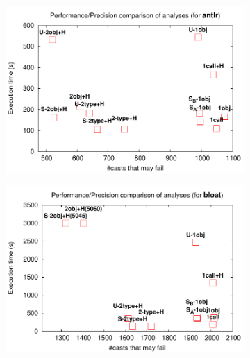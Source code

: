 
\begin{figure}[tb!p]
\begin{center}
\begin{subfigure}[b]{0.45\textwidth}
\includegraphics[width=\textwidth]{assets/hybrid/antlr.pdf}
\end{subfigure}\hspace{1cm}%
\begin{subfigure}[b]{0.45\textwidth}
\includegraphics[width=\textwidth]{assets/hybrid/bloat.pdf}
\end{subfigure}


\end{center}
\end{figure}
